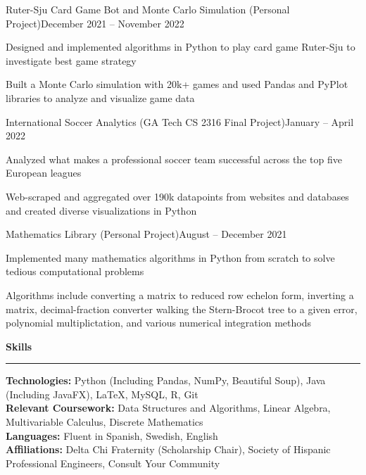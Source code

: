 \documentclass{article}
\newcommand{\horizontal}{\vspace{2pt}\hrule}
\newcommand{\sectitle}[1]{\vspace{2pt} \textbf{\large #1} \horizontal}
\newcommand{\skill}[2]{\textbf{#1:} #2}
\begin{document}
\begin{flushleft}

    \begin{subexperience}{Ruter-Sju Card Game Bot and Monte Carlo Simulation (Personal Project)}{December 2021 -- November 2022}
        \item Designed and implemented algorithms in Python to play card game Ruter-Sju to investigate best game strategy
        \item Built a Monte Carlo simulation with 20k+ games and used Pandas and PyPlot libraries to analyze and visualize game data
    \end{subexperience}

    \begin{subexperience}{International Soccer Analytics (GA Tech CS 2316 Final Project)}{January -- April 2022}
        \item Analyzed what makes a professional soccer team successful across the top five European leagues
        \item Web-scraped and aggregated over 190k datapoints from websites and databases and created diverse visualizations in Python
    \end{subexperience}

    \begin{subexperience}{Mathematics Library (Personal Project)}{August -- December 2021}
        \item Implemented many mathematics algorithms in Python from scratch to solve tedious computational problems
        \item Algorithms include converting a matrix to reduced row echelon form, inverting a matrix, decimal-fraction converter walking the Stern-Brocot tree to a given error, polynomial multiplictation, and various numerical integration methods
    \end{subexperience}

\sectitle{Skills}

    \vspace{3pt}
    \skill{Technologies}{Python (Including Pandas, NumPy, Beautiful Soup), Java (Including JavaFX), LaTeX, MySQL, R, Git} \\
    \skill{Relevant Coursework}{Data Structures and Algorithms, Linear Algebra, Multivariable Calculus, Discrete Mathematics} \\
    \skill{Languages}{Fluent in Spanish, Swedish, English} \\
    \skill{Affiliations}{Delta Chi Fraternity (Scholarship Chair), Society of Hispanic Professional Engineers, Consult Your Community}

\end{flushleft}
\end{document}
